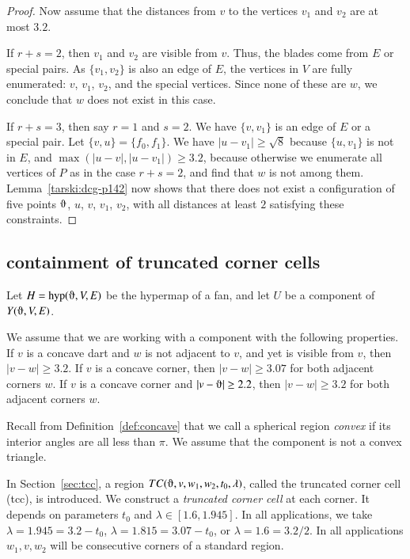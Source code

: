 \begin{proof}
Now assume that the distances from $v$ to the vertices $v_1$ and
$v_2$ are at most $3.2$.

If $r+s=2$, then $v_1$ and $v_2$ are visible from $v$. Thus, the
blades come from $E$ or special pairs.  As
$\{v_1,v_2\}$ is also an edge of $E$, the vertices in $V$ are fully
enumerated: $v$, $v_1$, $v_2$, and the special vertices.  
Since none of these are $w$, we conclude that $w$ does
not exist in this case.

If $r+s=3$, then say $r=1$ and $s=2$. We have $\{v,v_1\}$ is
an edge of $E$ or a special pair.  Let
$\{v,u\}=\{f_0,f_1\}$. We
have $|u-v_1|\ge\sqrt8$ because $\{u,v_1\}$ is not in $E$,
and $\max(|u-v|,|u-v_1|)\ge3.2$, because otherwise we enumerate
all vertices of $P$ as in the case $r+s=2$, and find that $w$ is
not among them. Lemma~\ref{tarski:dcg-p142} now shows that
there does not exist a configuration of five points
$\orgn$, $u$, $v$, $v_1$, $v_2$, with all distances at least $2$
satisfying these constraints.
\end{proof}















\subsection{containment of truncated corner cells} %


Let $H =\op{hyp}(\orgn,V,E)$ be the hypermap of a fan,
and let $U$ be a component
of $Y(\orgn,V,E)$.

We assume
that we are working with a component
with the following properties. If $v$ is a concave dart and $w$
is not adjacent to $v$, and yet is visible from $v$, then
$|v-w|\ge3.2$. If $v$ is a concave corner, then $|v-w|\ge3.07$ for
both adjacent corners $w$. If $v$ is a concave corner and
$|v-\orgn|\ge2.2$, then $|v-w|\ge3.2$ for both adjacent corners $w$.


Recall from Definition~\ref{def:concave} that we call a spherical
region {\it convex} if its interior angles are all less than
$\pi$. 
We assume
that the component is
not a convex triangle.

In Section~\ref{sec:tcc}, a region $TC(\orgn,v,w_1,w_2,t_0,\lambda)$,
called the
truncated corner cell (tcc), is introduced.
We construct a {\it truncated corner cell\/} at each corner.  It depends on 
parameters $t_0$ and $\lambda \in [1.6,1.945]$. In all applications, we
take
    $\lambda = 1.945 = 3.2-t_0$, $\lambda = 1.815 = 3.07-t_0$, or
    $\lambda = 1.6 = 3.2/2$.
In all applications $w_1,v,w_2$ will be consecutive corners of
a standard region.


